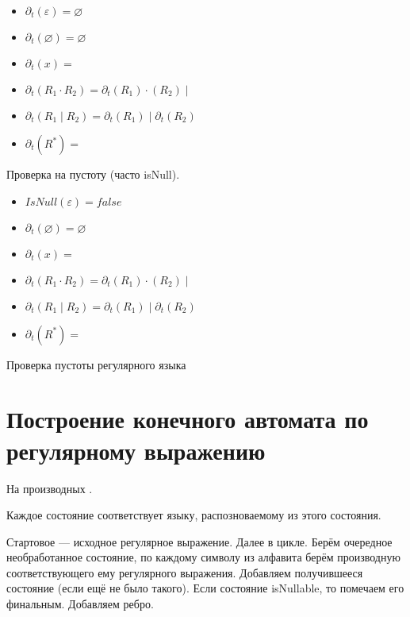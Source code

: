 \begin{itemize}
    \item $\partial_t(\varepsilon) = \varnothing$
    \item $\partial_t(\varnothing) = \varnothing$
    \item $\partial_t(x) = $
    \item $\partial_t(R_1 \cdot R_2) = \partial_t(R_1) \cdot (R_2) \mid $
    \item $\partial_t(R_1 \mid R_2) = \partial_t(R_1) \mid \partial_t(R_2) $
    \item $\partial_t(R^*) = $
\end{itemize}

Проверка на пустоту (часто isNull).

\begin{itemize}
    \item $IsNull(\varepsilon) = false$
    \item $\partial_t(\varnothing) = \varnothing$
    \item $\partial_t(x) = $
    \item $\partial_t(R_1 \cdot R_2) = \partial_t(R_1) \cdot (R_2) \mid $
    \item $\partial_t(R_1 \mid R_2) = \partial_t(R_1) \mid \partial_t(R_2) $
    \item $\partial_t(R^*) = $
\end{itemize}

Проверка пустоты регулярного языка


\section{Построение конечного автомата по регулярному выражению}
 
На производных%
.

Каждое состояние соответствует языку, распозноваемому из этого состояния.

Стартовое --- исходное регулярное выражение. Далее в цикле. 
Берём очередное необработанное состояние, по каждому символу из алфавита берём производную соответствующего ему регулярного выражения.
Добавляем получившееся состояние (если ещё не было такого).
Если состояние isNullable, то помечаем его финальным.
Добавляем ребро.

